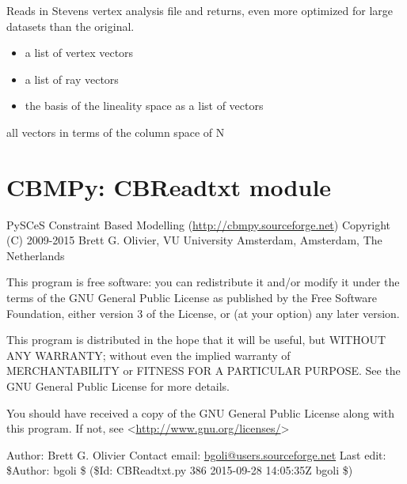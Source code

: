 \documentclass[a4paper,11pt,english]{sphinxmanual}
\begin{document}
\begin{fulllineitems}
\label{modules_doc:cbmpy.CBRead.readSK_vertexOld}
Reads in Stevens vertex analysis file and returns, even more optimized for large datasets than the original.
\begin{itemize}
\item {} 
a list of vertex vectors

\item {} 
a list of ray vectors

\item {} 
the basis of the lineality space as a list of vectors

\end{itemize}

all vectors in terms of the column space of N

\end{fulllineitems}

\label{modules_doc:module-cbmpy.CBReadtxt}

\section{CBMPy: CBReadtxt module}
\label{modules_doc:cbmpy-cbreadtxt-module}
PySCeS Constraint Based Modelling (\href{http://cbmpy.sourceforge.net}{http://cbmpy.sourceforge.net})
Copyright (C) 2009-2015 Brett G. Olivier, VU University Amsterdam, Amsterdam, The Netherlands

This program is free software: you can redistribute it and/or modify
it under the terms of the GNU General Public License as published by
the Free Software Foundation, either version 3 of the License, or
(at your option) any later version.

This program is distributed in the hope that it will be useful,
but WITHOUT ANY WARRANTY; without even the implied warranty of
MERCHANTABILITY or FITNESS FOR A PARTICULAR PURPOSE.  See the
GNU General Public License for more details.

You should have received a copy of the GNU General Public License
along with this program.  If not, see \textless{}\href{http://www.gnu.org/licenses/}{http://www.gnu.org/licenses/}\textgreater{}

Author: Brett G. Olivier
Contact email: \href{mailto:bgoli@users.sourceforge.net}{bgoli@users.sourceforge.net}
Last edit: \$Author: bgoli \$ (\$Id: CBReadtxt.py 386 2015-09-28 14:05:35Z bgoli \$)
\end{document}
